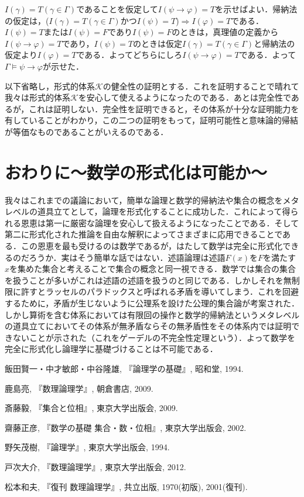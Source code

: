 \documentclass[10pt,b5paper,papersize,dvipdfmx]{jsbook}
\begin{document}
$I(\gamma)=T(\gamma \in \Gamma)$であることを仮定して$I(\psi \to \varphi)=T$を示せばよい．帰納法の仮定は，($I(\gamma)=T(\gamma \in \Gamma)$かつ$I(\psi)=T$)$\Rightarrow$$I(\varphi)=T$である．$I(\psi) = T$または$I(\psi) = F$であり$I(\psi) = F$のときは，真理値の定義から$I(\psi \to \varphi)=T$であり，$I(\psi) = T$のときは仮定$I(\gamma)=T(\gamma \in \Gamma)$と帰納法の仮定より$I(\varphi)=T$である．よってどちらにしろ$I(\psi \to \varphi)=T$である．よって$\Gamma \models \psi \to \varphi$が示せた．\par
以下省略し，形式的体系$\mathcal K$の健全性の証明とする．これを証明することで晴れて我々は形式的体系$\mathcal K$を安心して使えるようになったのである．あとは完全性であるが，これは証明しない．完全性を証明できると，その体系が十分な証明能力を有していることがわかり，この二つの証明をもって，証明可能性と意味論的帰結が等価なものであることがいえるのである．

\section{おわりに～数学の形式化は可能か～}
我々はこれまでの議論において，簡単な論理と数学的帰納法や集合の概念をメタレベルの道具立てとして，論理を形式化することに成功した．これによって得られる恩恵は第一に厳密な論理を安心して扱えるようになったことである．そして第二に形式化された推論を自由な解釈によってさまざまに応用できることである．この恩恵を最も受けるのは数学であるが，はたして数学は完全に形式化できるのだろうか．実はそう簡単な話ではない．述語論理は述語$F(x)$を$F$を満たす$x$を集めた集合と考えることで集合の概念と同一視できる．数学では集合の集合を扱うことが多いがこれは述語の述語を扱うのと同じである．しかしそれを無制限に許すとラッセルのパラドックスと呼ばれる矛盾を導いてしまう．これを回避するために，矛盾が生じないように公理系を設けた公理的集合論が考案された．しかし算術を含む体系においては有限回の操作と数学的帰納法というメタレベルの道具立てにおいてその体系が無矛盾ならその無矛盾性をその体系内では証明できないことが示された（これをゲーデルの不完全性定理という）．よって数学を完全に形式化し論理学に基礎づけることは不可能である．

\begin{thebibliography}{99}
  \item 飯田賢一・中才敏郎・中谷隆雄, 『論理学の基礎』, 昭和堂, 1994.
  \item 鹿島亮, 『数理論理学』, 朝倉書店, 2009.
  \item 斎藤毅, 『集合と位相』, 東京大学出版会, 2009.
  \item 齋藤正彦, 『数学の基礎 集合・数・位相』, 東京大学出版会, 2002.
  \item 野矢茂樹, 『論理学』, 東京大学出版会, 1994.
  \item 戸次大介, 『数理論理学』, 東京大学出版会, 2012.
  \item 松本和夫, 『復刊 数理論理学』, 共立出版, 1970(初版), 2001(復刊).
\end{thebibliography}
\end{document}
